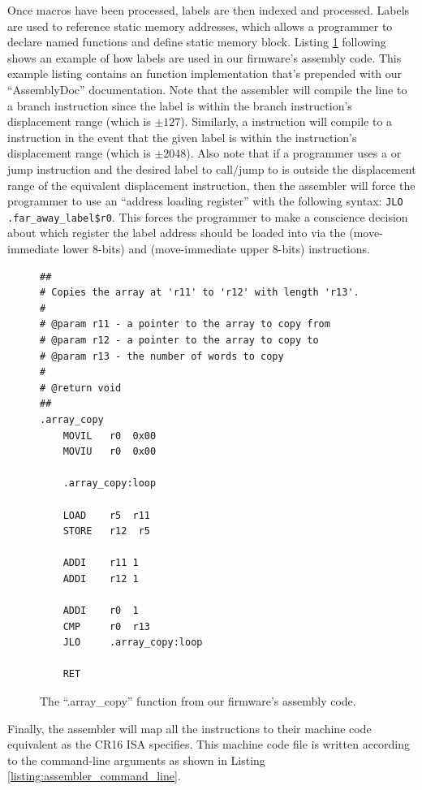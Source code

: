 \documentclass[conference]{IEEEtran}
\begin{document}
Once macros have been processed, labels are then indexed and processed. Labels are used to reference static memory addresses, which allows a programmer to declare named functions and define static memory block. Listing \ref{listing:assembly_code_labels} following shows an example of how labels are used in our firmware's assembly code. This example listing contains an  function implementation that's prepended with our ``AssemblyDoc'' documentation. Note that the assembler will compile the  line to a branch instruction since the  label is within the branch instruction's displacement range (which is $\pm127$). Similarly, a  instruction will compile to a  instruction in the event that the given label is within the  instruction's displacement range (which is $\pm2048$). Also note that if a programmer uses a  or jump instruction and the desired label to call/jump to is outside the displacement range of the equivalent displacement instruction, then the assembler will force the programmer to use an ``address loading register'' with the following syntax: \verb|JLO .far_away_label$r0|. This forces the programmer to make a conscience decision about which register the label address should be loaded into via the  (move-immediate lower 8-bits) and  (move-immediate upper 8-bits) instructions.
\begin{figure}
  \begin{lstlisting}
##
# Copies the array at 'r11' to 'r12' with length 'r13'.
#
# @param r11 - a pointer to the array to copy from
# @param r12 - a pointer to the array to copy to
# @param r13 - the number of words to copy
#
# @return void
##
.array_copy
    MOVIL   r0  0x00
    MOVIU   r0  0x00

    .array_copy:loop

    LOAD    r5  r11
    STORE   r12  r5

    ADDI    r11 1
    ADDI    r12 1

    ADDI    r0  1
    CMP     r0  r13
    JLO     .array_copy:loop

    RET
  \end{lstlisting}
  \caption{The ``.array\_copy'' function from our firmware's assembly code.}
  \label{listing:assembly_code_labels}
\end{figure}

Finally, the assembler will map all the instructions to their machine code equivalent as the CR16 ISA specifies. This machine code file is written according to the command-line arguments as shown in Listing \ref{listing:assembler_command_line}.
\end{document}
